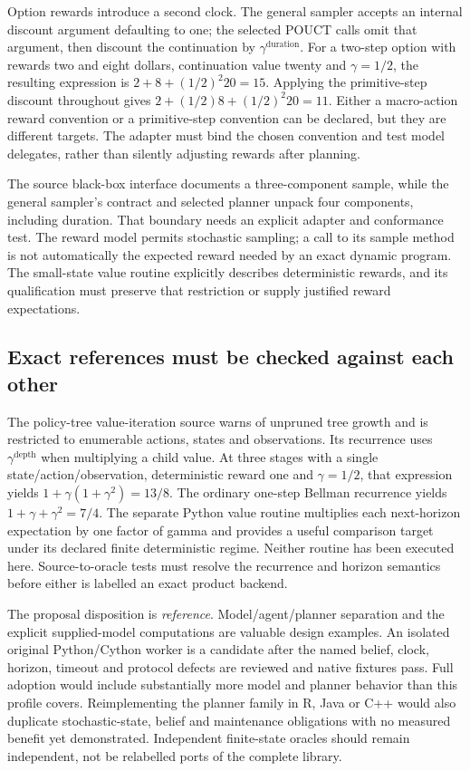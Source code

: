 Option rewards introduce a second clock. The general sampler accepts an
internal discount argument defaulting to one; the selected POUCT calls omit
that argument, then discount the continuation by $\gamma^{\text{duration}}$.
For a two-step option with rewards two and eight dollars, continuation value
twenty and $\gamma=1/2$, the resulting expression is $2+8+(1/2)^2 20=15$.
Applying the primitive-step discount throughout gives
$2+(1/2)8+(1/2)^2 20=11$. Either a macro-action reward convention or a
primitive-step convention can be declared, but they are different targets.
The adapter must bind the chosen convention and test model delegates, rather
than silently adjusting rewards after planning.
\citep{exec23_pomdppy_sources,exec23_pomdppy_reference}

The source black-box interface documents a three-component sample, while the
general sampler's contract and selected planner unpack four components,
including duration. That boundary needs an explicit adapter and conformance
test. The reward model permits stochastic sampling; a call to its sample method
is not automatically the expected reward needed by an exact dynamic program.
The small-state value routine explicitly describes deterministic rewards, and
its qualification must preserve that restriction or supply justified reward
expectations. \citep{exec23_pomdppy_sources}

\subsection{Exact references must be checked against each other}
\label{exec23:pomdppy-decision}
The policy-tree value-iteration source warns of unpruned tree growth and is
restricted to enumerable actions, states and observations. Its recurrence uses
$\gamma^{\text{depth}}$ when multiplying a child value. At three stages with a
single state/action/observation, deterministic reward one and $\gamma=1/2$, that
expression yields $1+\gamma(1+\gamma^2)=13/8$. The ordinary one-step Bellman
recurrence yields $1+\gamma+\gamma^2=7/4$. The separate Python value routine
multiplies each next-horizon expectation by one factor of gamma and provides
a useful comparison target under its declared finite deterministic regime.
Neither routine has been executed here. Source-to-oracle tests must resolve
the recurrence and horizon semantics before either is labelled an exact
product backend. \citep{exec23_pomdppy_sources,exec23_pomdppy_reference}

The proposal disposition is \emph{reference}. Model/agent/planner separation
and the explicit supplied-model computations are valuable design examples.
An isolated original Python/Cython worker is a candidate after the named belief,
clock, horizon, timeout and protocol defects are reviewed and native fixtures
pass. Full adoption would include substantially more model and planner behavior
than this profile covers. Reimplementing the planner family in R, Java or C++
would also duplicate stochastic-state, belief and maintenance obligations with
no measured benefit yet demonstrated. Independent finite-state oracles should
remain independent, not be relabelled ports of the complete library.

